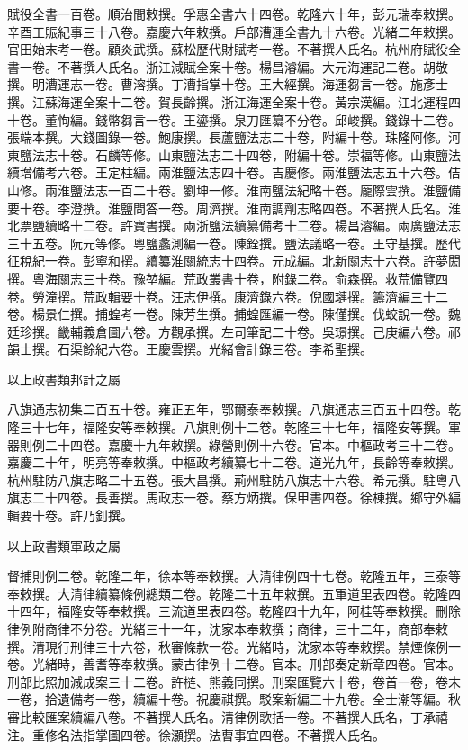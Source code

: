 \begin{pinyinscope}
賦役全書一百卷。順治間敕撰。孚惠全書六十四卷。乾隆六十年，彭元瑞奉敕撰。辛酉工賑紀事三十八卷。嘉慶六年敕撰。戶部漕運全書九十六卷。光緒二年敕撰。官田始末考一卷。顧炎武撰。蘇松歷代財賦考一卷。不著撰人氏名。杭州府賦役全書一卷。不著撰人氏名。浙江減賦全案十卷。楊昌濬編。大元海運記二卷。胡敬撰。明漕運志一卷。曹溶撰。丁漕指掌十卷。王大經撰。海運芻言一卷。施彥士撰。江蘇海運全案十二卷。賀長齡撰。浙江海運全案十卷。黃宗漢編。江北運程四十卷。董恂編。錢幣芻言一卷。王鎏撰。泉刀匯纂不分卷。邱峻撰。錢錄十二卷。張端本撰。大錢圖錄一卷。鮑康撰。長蘆鹽法志二十卷，附編十卷。珠隆阿修。河東鹽法志十卷。石麟等修。山東鹽法志二十四卷，附編十卷。崇福等修。山東鹽法續增備考六卷。王定柱編。兩淮鹽法志四十卷。吉慶修。兩淮鹽法志五十六卷。佶山修。兩淮鹽法志一百二十卷。劉坤一修。淮南鹽法紀略十卷。龐際雲撰。淮鹽備要十卷。李澄撰。淮鹽問答一卷。周濟撰。淮南調劑志略四卷。不著撰人氏名。淮北票鹽續略十二卷。許寶書撰。兩浙鹽法續纂備考十二卷。楊昌濬編。兩廣鹽法志三十五卷。阮元等修。粵鹽蠡測編一卷。陳銓撰。鹽法議略一卷。王守基撰。歷代征稅紀一卷。彭寧和撰。續纂淮關統志十四卷。元成編。北新關志十六卷。許夢閎撰。粵海關志三十卷。豫堃編。荒政叢書十卷，附錄二卷。俞森撰。救荒備覽四卷。勞潼撰。荒政輯要十卷。汪志伊撰。康濟錄六卷。倪國璉撰。籌濟編三十二卷。楊景仁撰。捕蝗考一卷。陳芳生撰。捕蝗匯編一卷。陳僅撰。伐蛟說一卷。魏廷珍撰。畿輔義倉圖六卷。方觀承撰。左司筆記二十卷。吳璟撰。己庚編六卷。祁韻士撰。石渠餘紀六卷。王慶雲撰。光緒會計錄三卷。李希聖撰。

以上政書類邦計之屬

八旗通志初集二百五十卷。雍正五年，鄂爾泰奉敕撰。八旗通志三百五十四卷。乾隆三十七年，福隆安等奉敕撰。八旗則例十二卷。乾隆三十七年，福隆安等撰。軍器則例二十四卷。嘉慶十九年敕撰。綠營則例十六卷。官本。中樞政考三十二卷。嘉慶二十年，明亮等奉敕撰。中樞政考續纂七十二卷。道光九年，長齡等奉敕撰。杭州駐防八旗志略二十五卷。張大昌撰。荊州駐防八旗志十六卷。希元撰。駐粵八旗志二十四卷。長善撰。馬政志一卷。蔡方炳撰。保甲書四卷。徐棟撰。鄉守外編輯要十卷。許乃釗撰。

以上政書類軍政之屬

督捕則例二卷。乾隆二年，徐本等奉敕撰。大清律例四十七卷。乾隆五年，三泰等奉敕撰。大清律續纂條例總類二卷。乾隆二十五年敕撰。五軍道里表四卷。乾隆四十四年，福隆安等奉敕撰。三流道里表四卷。乾隆四十九年，阿桂等奉敕撰。刪除律例附商律不分卷。光緒三十一年，沈家本奉敕撰；商律，三十二年，商部奉敕撰。清現行刑律三十六卷，秋審條款一卷。光緒時，沈家本等奉敕撰。禁煙條例一卷。光緒時，善耆等奉敕撰。蒙古律例十二卷。官本。刑部奏定新章四卷。官本。刑部比照加減成案三十二卷。許梿、熊義同撰。刑案匯覽六十卷，卷首一卷，卷末一卷，拾遺備考一卷，續編十卷。祝慶祺撰。駁案新編三十九卷。全士潮等編。秋審比較匯案續編八卷。不著撰人氏名。清律例歌括一卷。不著撰人氏名，丁承禧注。重修名法指掌圖四卷。徐灝撰。法曹事宜四卷。不著撰人氏名。


\end{pinyinscope}

